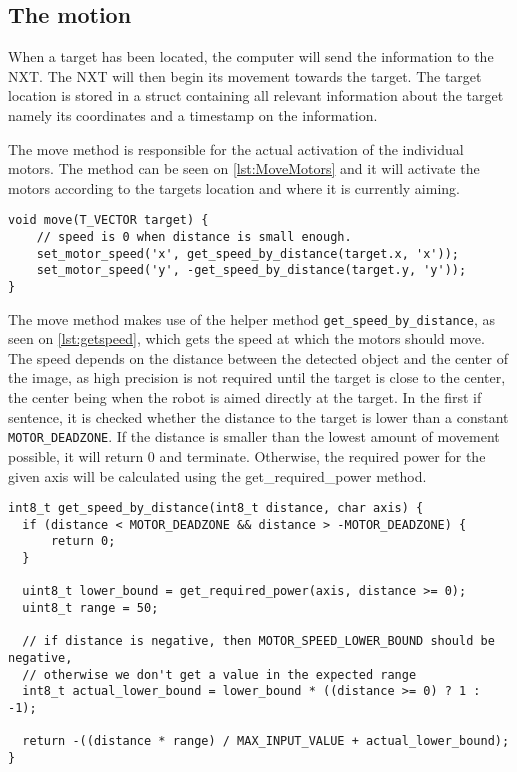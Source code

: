 \subsection{The motion}
When a target has been located, the computer will send the information to the NXT.
The NXT will then begin its movement towards the target.
The target location is stored in a struct containing all relevant information about the target namely its coordinates and a timestamp on the information.

The move method is responsible for the actual activation of the individual motors.
The method can be seen on \autoref{lst:MoveMotors} and it will activate the motors according to the targets location and where it is currently aiming.
\begin{lstlisting}[language=CSharp,caption={move method from movement.c},label={lst:MoveMotors}]
  void move(T_VECTOR target) {
    // speed is 0 when distance is small enough.
    set_motor_speed('x', get_speed_by_distance(target.x, 'x'));
    set_motor_speed('y', -get_speed_by_distance(target.y, 'y'));
}
\end{lstlisting}

The move method makes use of the helper method \texttt{get\_speed\_by\_distance}, as seen on \autoref{lst:getspeed}, which gets the speed at which the motors should move.
The speed depends on the distance between the detected object and the center of the image, as high precision is not required until the target is close to the center, the center being when the robot is aimed directly at the target.
In the first if sentence, it is checked whether the distance to the target is lower than a constant \texttt{MOTOR\_DEADZONE}.
If the distance is smaller than the lowest amount of movement possible, it will return 0 and terminate.
Otherwise, the required power for the given axis will be calculated using the get\_required\_power method.

\begin{lstlisting}[language=CSharp,caption={get\_speed\_by\_distance method from movement.c},label={lst:getspeed}]
int8_t get_speed_by_distance(int8_t distance, char axis) {
  if (distance < MOTOR_DEADZONE && distance > -MOTOR_DEADZONE) {
      return 0;
  }

  uint8_t lower_bound = get_required_power(axis, distance >= 0);
  uint8_t range = 50;

  // if distance is negative, then MOTOR_SPEED_LOWER_BOUND should be negative,
  // otherwise we don't get a value in the expected range
  int8_t actual_lower_bound = lower_bound * ((distance >= 0) ? 1 : -1);

  return -((distance * range) / MAX_INPUT_VALUE + actual_lower_bound);
}
\end{lstlisting}

